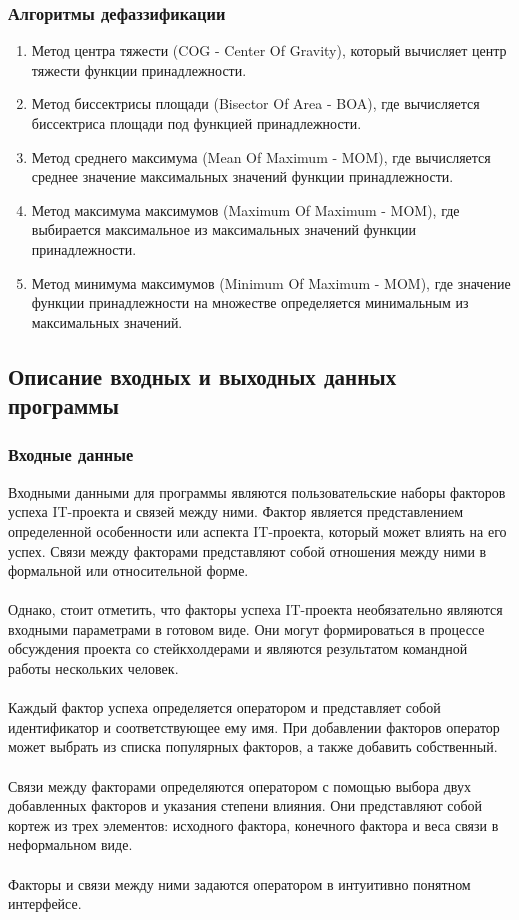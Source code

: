 \documentclass{article}
\begin{document}
    \subsubsection{Алгоритмы дефаззификации}
    \begin{enumerate}
        \item Метод центра тяжести (COG - Center Of Gravity), который вычисляет центр тяжести функции принадлежности.
        \item Метод биссектрисы площади (Bisector Of Area - BOA), где вычисляется биссектриса площади под функцией принадлежности.
        \item Метод среднего максимума (Mean Of Maximum - MOM), где вычисляется среднее значение максимальных значений функции принадлежности.
        \item Метод максимума максимумов (Maximum Of Maximum - MOM), где выбирается максимальное из максимальных значений функции принадлежности.
        \item Метод минимума максимумов (Minimum Of Maximum - MOM), где значение функции принадлежности на множестве определяется минимальным из максимальных значений.
    \end{enumerate}
    \subsection {Описание входных и выходных данных программы}
    \subsubsection{Входные данные}
    Входными данными для программы являются пользовательские наборы факторов успеха IT-проекта и связей между ними. Фактор является представлением определенной особенности или аспекта IT-проекта, который может влиять на его успех. Связи между факторами представляют собой отношения между ними в формальной или относительной форме.\\
    ~\\
    Однако, стоит отметить, что факторы успеха IT-проекта необязательно являются входными параметрами в готовом виде. Они могут формироваться в процессе обсуждения проекта со стейкхолдерами и являются результатом командной работы нескольких человек.\\
    ~\\
    Каждый фактор успеха определяется оператором и представляет собой идентификатор и соответствующее ему имя. При добавлении факторов оператор может выбрать из списка популярных факторов, а также добавить собственный.\\
    ~\\
    Связи между факторами определяются оператором с помощью выбора двух добавленных факторов и указания степени влияния. Они представляют собой кортеж из трех элементов: исходного фактора, конечного фактора и веса связи в неформальном виде.\\
    ~\\
    Факторы и связи между ними задаются оператором в интуитивно понятном интерфейсе.
\end{document}
